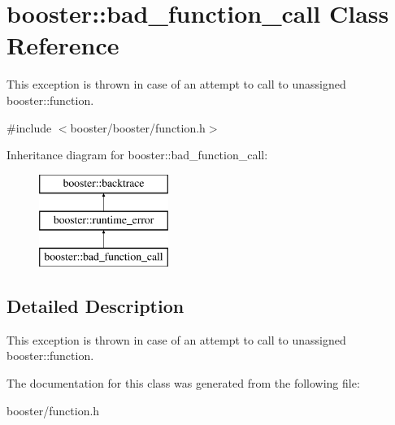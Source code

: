 \section{booster\-:\-:bad\-\_\-function\-\_\-call \-Class \-Reference}
\label{classbooster_1_1bad__function__call}


\-This exception is thrown in case of an attempt to call to unassigned booster\-::function.  




{\ttfamily \#include $<$booster/booster/function.\-h$>$}

\-Inheritance diagram for booster\-:\-:bad\-\_\-function\-\_\-call\-:\begin{figure}[H]
\begin{center}
\leavevmode
\includegraphics[height=3.000000cm]{classbooster_1_1bad__function__call}
\end{center}
\end{figure}


\subsection{\-Detailed \-Description}
\-This exception is thrown in case of an attempt to call to unassigned booster\-::function. 

\-The documentation for this class was generated from the following file\-:\begin{DoxyCompactItemize}
\item 
booster/function.\-h\end{DoxyCompactItemize}
